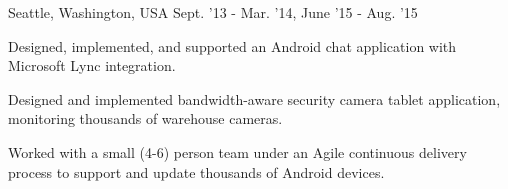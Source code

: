 \begin{cventries}
    {Seattle, Washington, USA} %
    {Sept. '13 - Mar. '14,
    June '15 - Aug. '15} %
    {
        \begin{cvitems}
            \item Designed, implemented, and supported an Android chat application with Microsoft Lync integration.
            \item Designed and implemented bandwidth-aware security camera tablet application, monitoring thousands of warehouse cameras.
            \item Worked with a small (4-6) person team under an Agile continuous delivery process to support and update thousands of Android devices.
        \end{cvitems}
    }
\fi
\end{cventries}
